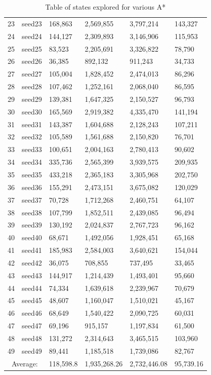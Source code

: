 \documentclass{article}
\begin{document}
\begin{center}
\begin{table}
\begin{tabular}{ |p{0.75cm}|p{1cm}|p{2cm}|p{2cm}|p{2cm}|p{2cm}| }
    23 & seed23 & 168,863 & 2,569,855 & 3,797,214 & 143,327\\
    24 & seed24 & 144,127 & 2,309,893 & 3,146,906 & 115,953\\
    25 & seed25 & 83,523 & 2,205,691 & 3,326,822 & 78,790\\
    26 & seed26 & 36,385 & 892,132 & 911,243 & 34,733\\
    27 & seed27 & 105,004 & 1,828,452 & 2,474,013 & 86,296\\
    28 & seed28 & 107,462 & 1,252,161 & 2,068,040 & 86,595\\
    29 & seed29 & 139,381 & 1,647,325 & 2,150,527 & 96,793\\
    30 & seed30 & 165,569 & 2,919,382 & 4,335,470 & 141,194\\
    31 & seed31 & 143,387 & 1,604,688 & 2,128,243 & 107,211\\
    32 & seed32 & 105,589 & 1,561,688 & 2,150,820 & 76,701\\
    33 & seed33 & 100,651 & 2,004,163 & 2,780,413 & 90,602\\
    34 & seed34 & 335,736 & 2,565,399 & 3,939,575 & 209,935\\
    35 & seed35 & 433,218 & 2,365,183 & 3,305,968 & 202,750\\
    36 & seed36 & 155,291 & 2,473,151 & 3,675,082 & 120,029\\
    37 & seed37 & 70,728 & 1,712,268 & 2,460,751 & 64,107\\
    38 & seed38 & 107,799 & 1,852,511 & 2,439,085 & 96,494\\
    39 & seed39 & 130,192 & 2,024,837 & 2,767,723 & 96,162\\
    40 & seed40 & 68,671 & 1,492,056 & 1,928,451 & 65,168\\
    41 & seed41 & 185,983 & 2,584,003 & 3,640,621 & 154,044\\
    42 & seed42 & 36,075 & 708,855 & 737,495 & 33,465\\
    43 & seed43 & 144,917 & 1,214,439 & 1,493,401 & 95,660\\
    44 & seed44 & 74,334 & 1,639,618 & 2,239,967 & 70,679\\
    45 & seed45 & 48,607 & 1,160,047 & 1,510,021 & 45,167\\
    46 & seed46 & 68,649 & 1,540,422 & 2,090,725 & 60,031\\
    47 & seed47 & 69,196 & 915,157 & 1,197,834 & 61,500\\
    48 & seed48 & 131,272 & 2,314,643 & 3,465,515 & 103,960\\
    49 & seed49 & 89,441 & 1,185,518 & 1,739,086 & 82,767\\

    \hline
    
    \multicolumn{2}{|c|}{Average:} & 118,598.8 & 1,935,268.26 & 2,732,446.08 & 95,739.16\\
    \hline
    \end{tabular}
\caption{Table of states explored for various A*}
\label{table1}
\end{table}
\end{center}
\end{document}
